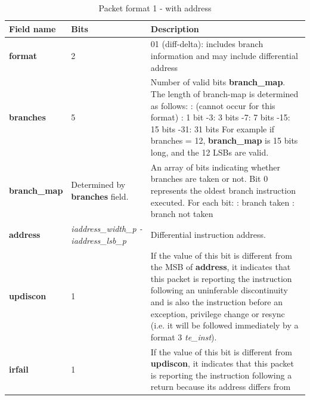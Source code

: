 \begin{table}[htp]
  \centering
  \caption{Packet format 1 - with address}
  \label{tab:te_inst0-1-addr}
  \begin{tabulary}{\textwidth}{|l|p{35mm}|p{90mm}|}
    \hline
    {\bf Field name} & {\bf Bits} & {\bf Description} \\
    \hline
    \textbf{format}	& 2	& 01 (diff-delta): includes branch information and may include differential address\\
    \hline
    \textbf{branches} & 5 & Number of valid bits \textbf{branch\_map}. The length of branch-map is determined as follows: :	   (cannot occur for this format) :	   1 bit -3:   3 bits -7:   7 bits -15:  15 bits -31: 31 bits \newline
    For example if branches = 12, \textbf{branch\_map} is 15 bits long, and the 12 LSBs are valid. \\
    \hline
    \textbf{branch\_map} & Determined by \newline 
                 \textbf{branches} field. & 
                 An array of bits indicating whether branches are taken or not.\newline
    Bit 0 represents the oldest branch instruction executed.   For each bit: : branch taken : branch not taken \\
    \hline
    \textbf{address}	& \textit {iaddress\_width\_p - iaddress\_lsb\_p} & 
                Differential instruction address.\\
    \hline
    \textbf{updiscon}	& 1 & 
                If the value of this bit is different from the MSB of \textbf{address}, it indicates that this 
                packet is reporting the instruction following an uninferable discontinuity and is also the 
                instruction before an exception, privilege change or resync 
                (i.e. it will be followed immediately by a format 3 \textit{te\_inst}).\\
    \hline
    \textbf{irfail}	& 1 & 
                If the value of this bit is different from \textbf{updiscon}, it indicates that this
                packet is reporting the instruction following a return because its address differs from 

\end{tabulary}
\end{table}

